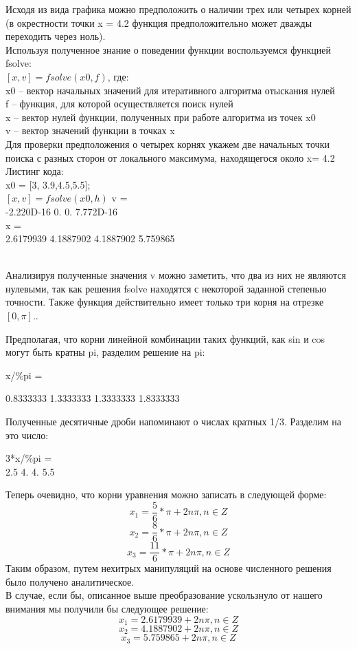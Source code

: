 ﻿ \documentclass[russian,utf8,nocolumnxxxi,nocolumnxxxii]{eskdtext}
\begin{document}
Исходя из вида графика можно предположить о наличии трех или четырех корней (в окрестности точки x = 4.2 функция предположительно может дважды переходить через ноль).
\\Используя полученное знание о поведении функции воспользуемся функцией fsolve:
\\$[x,v] = fsolve(x0,f)$, где:
\\x0 – вектор начальных значений для итеративного алгоритма отыскания нулей
\\f – функция, для которой осуществляется поиск нулей
\\x – вектор нулей функции, полученных при работе алгоритма из точек x0
\\v – вектор значений функции в точках x
\\Для проверки предположения о четырех корнях укажем две начальных точки поиска с разных сторон от локального максимума, находящегося около x= 4.2
\\Листинг кода:
\\x0 = [3, 3.9,4.5,5.5];
\\$[x,v] = fsolve(x0,h)$
\newpage
v =\\
-2.220D-16 0. 0. 7.772D-16\\
x =\\
2.6179939 4.1887902 4.1887902 5.759865


\\Анализируя полученные значения v можно заметить, что два из них не являются нулевыми, так как решения fsolve находятся с некоторой заданной степенью точности. Также функция действительно имеет только три корня на отрезке $[0,\pi]$..

Предполагая, что корни линейной комбинации таких функций, как sin и cos могут быть кратны pi, разделим решение на pi:

x/\%pi =

0.8333333 1.3333333 1.3333333 1.8333333

Полученные десятичные дроби напоминают о числах кратных 1/3. Разделим на это число:

3*x/\%pi =
\\2.5 4. 4. 5.5

\newpage
Теперь очевидно, что корни уравнения можно записать в следующей форме:
$$x_1=\frac{5}{6}*\pi+2n\pi,n\in Z$$
$$x_2=\frac{8}{6}*\pi+2n\pi,n\in Z$$
$$x_3=\frac{11}{6}*\pi+2n\pi,n\in Z$$
Таким образом, путем нехитрых манипуляций на основе численного решения было получено аналитическое.\\
В случае, если бы, описанное выше преобразование ускользнуло от нашего внимания мы получили бы следующее решение:
$$x_1=2.6179939+2n\pi,n\in Z$$
$$x_2=4.1887902+2n\pi,n\in Z$$
$$x_3=5.759865+2n\pi,n\in Z$$
\end{document}
